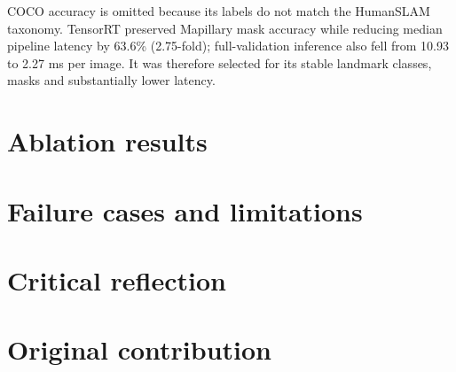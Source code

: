 COCO accuracy is omitted because its labels do not match the HumanSLAM
taxonomy. TensorRT preserved Mapillary mask accuracy while reducing median
pipeline latency by 63.6\% (2.75-fold); full-validation inference also fell
from 10.93 to 2.27 ms per image. It was therefore selected for its stable
landmark classes, masks and substantially lower latency.

\section{Ablation results}

\section{Failure cases and limitations}

\section{Critical reflection}

\section{Original contribution}
